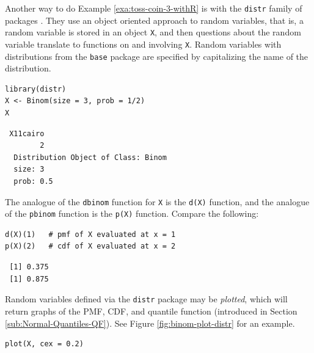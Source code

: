 \documentclass[captions=tableheading]{scrbook}
\begin{document}
\begin{example}
Another way to do Example \ref{exa:toss-coin-3-withR} is with the \texttt{distr} family of packages \cite{Ruckdescheldistr}. They use an object oriented approach to random variables, that is, a random variable is stored in an object \texttt{X}, and then questions about the random variable translate to functions on and involving \texttt{X}. Random variables with distributions from the \texttt{base} package are specified by capitalizing the name of the distribution.


\begin{verbatim}
library(distr)
X <- Binom(size = 3, prob = 1/2)
X
\end{verbatim}

\begin{verbatim}
 X11cairo 
        2
  Distribution Object of Class: Binom
  size: 3
  prob: 0.5
\end{verbatim}

The analogue of the \texttt{dbinom} function for \texttt{X} is the \texttt{d(X)} function, and the analogue of the \texttt{pbinom} function is the \texttt{p(X)} function. Compare the following:


\begin{verbatim}
d(X)(1)   # pmf of X evaluated at x = 1
p(X)(2)   # cdf of X evaluated at x = 2
\end{verbatim}

\begin{verbatim}
 [1] 0.375
 [1] 0.875
\end{verbatim}

\end{example}

Random variables defined via the \texttt{distr} package may be \emph{plotted}, which will return graphs of the PMF, CDF, and quantile function (introduced in Section \ref{sub:Normal-Quantiles-QF}). See Figure \ref{fig:binom-plot-distr} for an example.


\begin{verbatim}
plot(X, cex = 0.2)
\end{verbatim}
\end{document}
